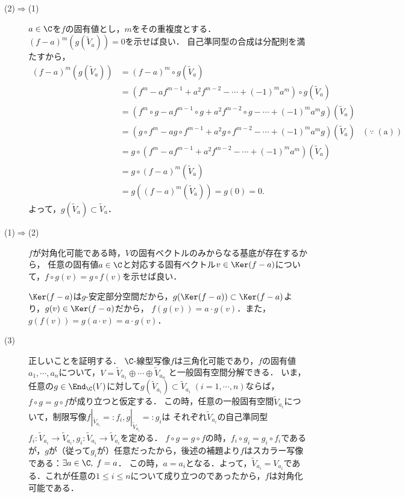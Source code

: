 \documentclass[uplatex, dvipdfmx]{jsreport}
\begin{document}
\begin{Proof}
    \begin{description}
        \item[(2)$\Rightarrow$(1)] 
        $a\in\C$を$f$の固有値とし，$m$をその重複度とする．$(f-a)^m(g(\widetilde{V}_a))=0$を示せば良い．
        自己準同型の合成は分配則を満たすから，
        \begin{align*}
            (f-a)^m(g(\widetilde{V}_a))&=(f-a)^m\circ g(\widetilde{V}_a)\\
            &=(f^m-af^{m-1}+a^2f^{m-2}-\cdots+(-1)^ma^m)\circ g(\widetilde{V}_a)\\
            &=(f^m\circ g-af^{m-1}\circ g+a^2f^{m-2}\circ g-\cdots+(-1)^ma^mg)(\widetilde{V}_a)\\
            &=(g\circ f^m-ag\circ f^{m-1}+a^2 g\circ f^{m-2}-\cdots+(-1)^ma^mg)(\widetilde{V}_a)&(\because\;\mathrm{(a)})\\
            &=g\circ(f^m-af^{m-1}+a^2f^{m-2}-\cdots+(-1)^ma^m)(\widetilde{V}_a)\\
            &=g\circ(f-a)^m(\widetilde{V}_a)\\
            &=g((f-a)^m(\widetilde{V}_a))=g(0)=0.
        \end{align*}
        よって，$g(\widetilde{V}_a)\subset\widetilde{V}_a$．
        \item[(1)$\Rightarrow$(2)]
        $f$が対角化可能である時，$V$の固有ベクトルのみからなる基底が存在するから，
        任意の固有値$a\in\C$と対応する固有ベクトル$v\in\Ker(f-a)$について，$f\circ g(v)=g\circ f(v)$を示せば良い．
    
        $\Ker(f-a)$は$g$-安定部分空間だから，$g(\Ker(f-a))\subset\Ker(f-a)$より，$g(v)\in\Ker(f-a)$だから，
        $f(g(v))=a\cdot g(v)$．また，$g(f(v))=g(a\cdot v)=a\cdot g(v)$．
    
        \item[(3)]
        正しいことを証明する．
        $\C$-線型写像$f$は三角化可能であり，$f$の固有値$a_1,\cdots,a_n$について，$V=\widetilde{V}_{a_1}\oplus\cdots\oplus\widetilde{V}_{a_n}$
        と一般固有空間分解できる．
        いま，任意の$g\in\End_\C(V)$に対して$g(\widetilde{V}_{a_i})\subset\widetilde{V}_{a_i}\;(i=1,\cdots,n)$ならば，$f\circ g=g\circ f$が成り立つと仮定する．
        この時，任意の一般固有空間$\widetilde{V}_{a_i}$について，制限写像$f|_{\widetilde{V}_{a_i}}=:f_i,g|_{\widetilde{V}_{a_i}}=:g_i$は
        それぞれ$\widetilde{V}_{a_i}$の自己準同型$f_i:\widetilde{V}_{a_i}\to\widetilde{V}_{a_i},g_i:\widetilde{V}_{a_i}\to\widetilde{V}_{a_i}$を定める．
        $f\circ g=g\circ f$の時，$f_i\circ g_i=g_i\circ f_i$であるが，$g$が（従って$g_i$が）任意だったから，後述の補題より$f$はスカラー写像である：$\exists a\in\C,\;f=a$．
        この時，$a=a_i$となる．よって，$\widetilde{V}_{a_i}=V_{a_i}$である．これが任意の$1\le i\le n$について成り立つのであったから，$f$は対角化可能である．
    \end{description}
\end{Proof}
\end{document}
